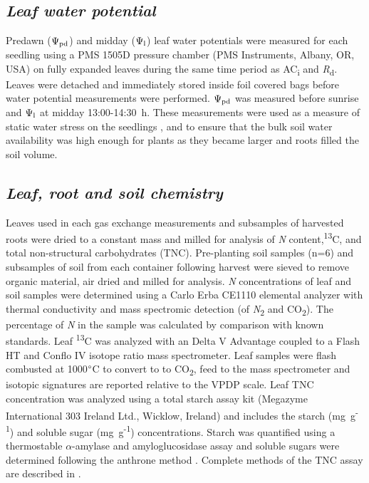 \documentclass[a4paper]{article}\usepackage[]{graphicx}\usepackage[]{color}
\begin{document}
\subsection*{\textit{Leaf water potential}}
Predawn ($\Psi\textsubscript{pd}$) and midday ($\Psi\textsubscript{l}$) leaf water potentials were measured for each seedling using a PMS 1505D pressure chamber (PMS Instruments, Albany, OR, USA) on fully expanded leaves during the same time period as AC\textsubscript{i} and \textit{R}\textsubscript{d}. Leaves were detached and immediately stored inside foil covered bags before water potential measurements were performed. $\Psi\textsubscript{pd}$ was measured before sunrise and $\Psi\textsubscript{l}$ at midday 13:00-14:30~h. These measurements were used as a measure of static water stress on the seedlings \citep{sellin1999does}, and to ensure that the bulk soil water availability was high enough for plants as they became larger and roots filled the soil volume. 

\subsection*{\textit{Leaf, root and soil chemistry}}
Leaves used in each gas exchange measurements and subsamples of harvested roots were dried to a constant mass and milled for analysis of \textit{N} content,{\textdelta}\textsuperscript{13}C, and total non-structural carbohydrates (TNC). Pre-planting soil samples (n=6) and subsamples of soil from each container following harvest were sieved to remove organic material, air dried and milled for analysis. \textit{N} concentrations of leaf and soil samples were determined using a Carlo Erba CE1110 elemental analyzer with thermal conductivity and mass spectromic detection (of \textit{N}\textsubscript{2} and CO\textsubscript{2}).  The percentage of \textit{N} in the sample was calculated by comparison with known standards. Leaf {\textdelta}\textsuperscript{13}C was analyzed  with an Delta V Advantage coupled to a Flash HT and Conflo IV isotope ratio mass spectrometer. Leaf samples were flash combusted at 1000$\degree$C to convert to to CO\textsubscript{2}, feed to the mass spectrometer and isotopic signatures are reported relative to the VPDP scale. Leaf TNC concentration was analyzed using a total starch assay kit (Megazyme International 303 Ireland Ltd., Wicklow, Ireland) and includes the starch (mg~g\textsuperscript{-1}) and soluble sugar (mg~g\textsuperscript{-1}) concentrations. Starch was quantified using a thermostable $\alpha$-amylase and amyloglucosidase assay \citep{McCleary_starch} and soluble sugars were determined following the anthrone method \citep{ebell1969variation}. Complete methods of the TNC assay are described in \citep{mitchell2013drought}.
\end{document}
